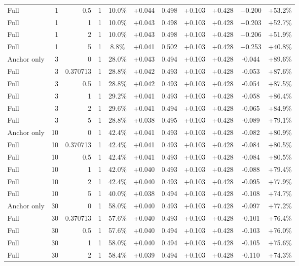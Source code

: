 \begin{table}[htbp]
\begin{tabular}{lrrrccccccc}
Full & 1 & 0.5 & 1 & 10.0\% & +0.044 & 0.498 & +0.103 & +0.428 & +0.200 & +53.2\% \\
Full & 1 & 1 & 1 & 10.0\% & +0.043 & 0.498 & +0.103 & +0.428 & +0.203 & +52.7\% \\
Full & 1 & 2 & 1 & 10.0\% & +0.043 & 0.498 & +0.103 & +0.428 & +0.206 & +51.9\% \\
Full & 1 & 5 & 1 & 8.8\% & +0.041 & 0.502 & +0.103 & +0.428 & +0.253 & +40.8\% \\
Anchor only & 3 & 0 & 1 & 28.0\% & +0.043 & 0.494 & +0.103 & +0.428 & -0.044 & +89.6\% \\
Full & 3 & 0.370713 & 1 & 28.8\% & +0.042 & 0.493 & +0.103 & +0.428 & -0.053 & +87.6\% \\
Full & 3 & 0.5 & 1 & 28.8\% & +0.042 & 0.493 & +0.103 & +0.428 & -0.054 & +87.5\% \\
Full & 3 & 1 & 1 & 29.2\% & +0.041 & 0.493 & +0.103 & +0.428 & -0.058 & +86.4\% \\
Full & 3 & 2 & 1 & 29.6\% & +0.041 & 0.494 & +0.103 & +0.428 & -0.065 & +84.9\% \\
Full & 3 & 5 & 1 & 28.8\% & +0.038 & 0.495 & +0.103 & +0.428 & -0.089 & +79.1\% \\
Anchor only & 10 & 0 & 1 & 42.4\% & +0.041 & 0.493 & +0.103 & +0.428 & -0.082 & +80.9\% \\
Full & 10 & 0.370713 & 1 & 42.4\% & +0.041 & 0.493 & +0.103 & +0.428 & -0.084 & +80.5\% \\
Full & 10 & 0.5 & 1 & 42.4\% & +0.041 & 0.493 & +0.103 & +0.428 & -0.084 & +80.5\% \\
Full & 10 & 1 & 1 & 42.0\% & +0.040 & 0.493 & +0.103 & +0.428 & -0.088 & +79.4\% \\
Full & 10 & 2 & 1 & 42.4\% & +0.040 & 0.493 & +0.103 & +0.428 & -0.095 & +77.9\% \\
Full & 10 & 5 & 1 & 40.0\% & +0.038 & 0.494 & +0.103 & +0.428 & -0.108 & +74.7\% \\
Anchor only & 30 & 0 & 1 & 58.0\% & +0.040 & 0.493 & +0.103 & +0.428 & -0.097 & +77.2\% \\
Full & 30 & 0.370713 & 1 & 57.6\% & +0.040 & 0.493 & +0.103 & +0.428 & -0.101 & +76.4\% \\
Full & 30 & 0.5 & 1 & 57.6\% & +0.040 & 0.494 & +0.103 & +0.428 & -0.103 & +76.0\% \\
Full & 30 & 1 & 1 & 58.0\% & +0.040 & 0.494 & +0.103 & +0.428 & -0.105 & +75.6\% \\
Full & 30 & 2 & 1 & 58.4\% & +0.039 & 0.494 & +0.103 & +0.428 & -0.110 & +74.3\% \\

\end{tabular}
\end{table}
